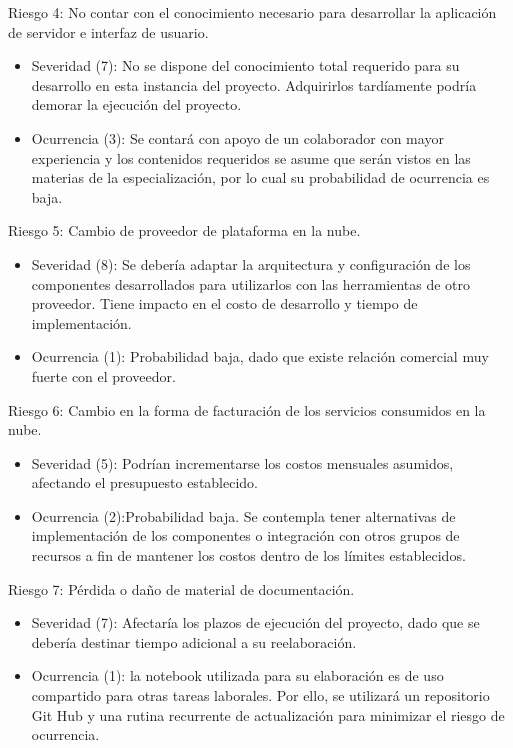 \documentclass[
11pt, %
]{charter}
\begin{document}
Riesgo 4: No contar con el conocimiento necesario para desarrollar la aplicación de servidor e interfaz de usuario.
\begin{itemize}
	\item Severidad (7): No se dispone del conocimiento total requerido para su desarrollo en esta instancia del proyecto. Adquirirlos tardíamente podría demorar la ejecución del proyecto.
	\item Ocurrencia (3): Se contará con apoyo de un colaborador con mayor experiencia y los contenidos requeridos se asume que serán vistos en las materias de la especialización, por lo cual su probabilidad de ocurrencia es baja.
\end{itemize}

Riesgo 5: Cambio de proveedor de plataforma en la nube.
\begin{itemize}
	\item Severidad (8): Se debería adaptar la arquitectura y configuración de los componentes desarrollados para utilizarlos con las herramientas de otro proveedor. Tiene impacto en el costo de desarrollo y tiempo de implementación.
	\item Ocurrencia (1): Probabilidad baja, dado que existe relación comercial muy fuerte con el proveedor.
\end{itemize}

Riesgo 6: Cambio en la forma de facturación de los servicios consumidos en la nube.
\begin{itemize}
	\item Severidad (5): Podrían incrementarse los costos mensuales asumidos, afectando el presupuesto establecido.
	\item Ocurrencia (2):Probabilidad baja. Se contempla tener alternativas de implementación de los componentes o integración con otros grupos de recursos a fin de mantener los costos dentro de los límites establecidos.
\end{itemize}


Riesgo 7: Pérdida o daño de material de documentación.
\begin{itemize}
	\item Severidad (7): Afectaría los plazos de ejecución del proyecto, dado que se debería destinar tiempo adicional a su reelaboración.
	\item Ocurrencia (1): la notebook utilizada para su elaboración es de uso compartido para otras tareas laborales. Por ello, se utilizará un repositorio Git Hub y una rutina recurrente de actualización para minimizar el riesgo de ocurrencia.
\end{itemize}
\end{document}
